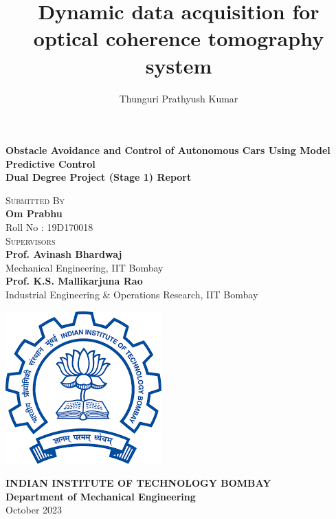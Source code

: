 \documentclass[11pt,a4paper]{report}
\begin{document}
\title{Dynamic data acquisition for optical coherence tomography system}
\author{Thunguri Prathyush Kumar}


\begin{titlepage}

\begin{center}
        \vspace*{1in}
        {\Large \textbf{Obstacle Avoidance and Control of Autonomous Cars Using \newline Model Predictive Control\\
        }}
        \vspace*{0.4in}
        {\large \textbf{Dual Degree Project (Stage 1) Report}\\}
        \vspace*{0.4in}     
        
        \textsc{Submitted By}\\
        \vspace{.2cm}
        {\large \textbf{Om Prabhu}} \\
        {Roll No : 19D170018} \\
        \vspace*{.4in}
        \textsc{Supervisors} \\
        \vspace{.2cm}
        {\large \textbf{Prof. Avinash Bhardwaj}} \\
        {Mechanical Engineering, IIT Bombay} \\ 
        \vspace*{.2cm}
        {\large \textbf{Prof. K.S. Mallikarjuna Rao}} \\ 
        {Industrial Engineering \& Operations Research, IIT Bombay} \\
        \vspace*{0.5in}

        \begin{center}
        \includegraphics[scale = 0.5]{iitb_logo.png}
        \end{center}
        \vspace*{0.2in}
       
        \Large{ \textbf{ INDIAN INSTITUTE OF TECHNOLOGY BOMBAY}}\\
        \vspace{.3cm}
        \large {{\textbf{Department of Mechanical Engineering}}}\\
        \vspace{.3cm}
        { October 2023 }
        \vfill
    \end{center}
\end{titlepage}
    
\end{document}
